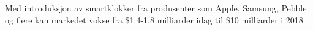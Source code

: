 
Med introduksjon av smartklokker fra produsenter som Apple, Samsung, Pebble og
flere kan markedet vokse fra \${}1.4-1.8 milliarder idag til \${}10
milliarder i 2018 \cite{citi.grow}.

